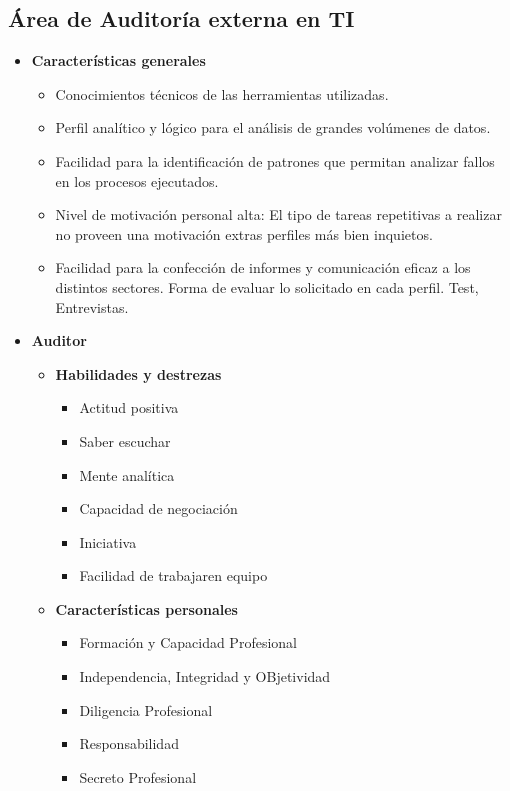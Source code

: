         \subsection{Área de Auditoría externa en TI}
            \begin{itemize}
            \item \textbf{Características generales          	}
                  \begin{itemize}
	                  \item Conocimientos técnicos de las herramientas utilizadas. 
                      \item Perfil analítico y lógico para el análisis de grandes volúmenes de datos. 
                      \item Facilidad para la identificación de patrones que permitan analizar fallos en los procesos ejecutados. 
                      \item  Nivel de motivación personal alta: El tipo de tareas repetitivas a realizar no proveen una motivación extras perfiles más bien inquietos. 
                      \item Facilidad para la confección de informes y comunicación eficaz a los distintos sectores. Forma de evaluar lo solicitado en cada perfil. Test, Entrevistas. 
                  \end{itemize}
           	\item \textbf{Auditor}
            	
                \begin{itemize}
                \item \textbf{Habilidades y destrezas }

                  \begin{itemize}
                      \item Actitud positiva
                       \item Saber escuchar
                       \item Mente analítica
                        \item Capacidad de negociación
                       \item Iniciativa
                       \item Facilidad de trabajaren equipo
                  \end{itemize}
				
                \item \textbf{Características personales}

                    \begin{itemize}
                        \item     Formación y Capacidad Profesional
                        \item    Independencia, Integridad y OBjetividad
                        \item    Diligencia Profesional
                        \item    Responsabilidad
                        \item    Secreto Profesional
                    \end{itemize}



\end{itemize}
\end{itemize}
